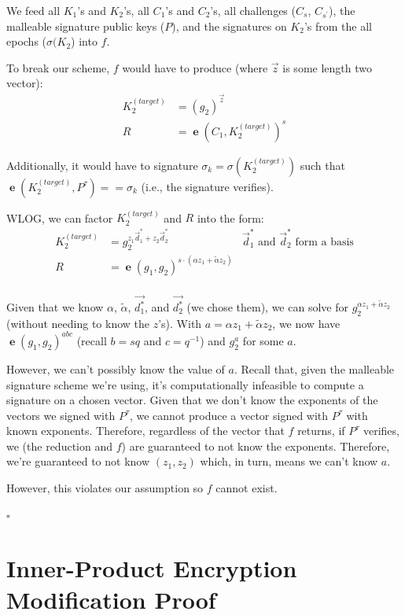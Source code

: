 \documentclass[pdftex,12pt,a4papaer,twoside,notitlepage]{report}
\DeclareMathOperator{\e}{\mathbf{e}}
\begin{document}
\begin{appendices}
We feed all $K_1$'s and $K_2$'s, all $C_1$'s and $C_2$'s, all challenges ($C_s$,
$C_{s^\prime}$), the malleable signature public keys ($P$), and the signatures on
$K_2$'s from the all epochs ($\sigma(K_2$) into $f$.

To break our scheme, $f$ would have to produce (where $\vec{z}$ is some length two vector):
\begin{align*}
  K^{(\mathit{target})}_{2} &= (g_2)^{\vec{z}} \\
  R &= \e(C_1, K^{(\mathit{target})}_{2})^s
\end{align*}

Additionally, it would have to signature $\sigma_k =
\sigma(K^{(\mathit{target})}_2)$ such that $\e(K^{(\mathit{target})}_2, P^\tau)
== \sigma_k$ (i.e., the signature verifies).

WLOG, we can factor $K_2^{\mathit{(target)}}$ and $R$ into the form:
\begin{align*}
  K_2^{\mathit{(target)}} &= g_2^{z_1 \vec{d}_1^* + z_2 \vec{d}_2^*} & \text{$\vec{d}_1^*$ and $\vec{d}_2^*$ form a basis} \\
  R &= \e(g_1, g_2)^{s \cdot (\alpha z_1 + \tilde{\alpha} z_2)} \\
\end{align*}

Given that we know $\alpha$, $\tilde{\alpha}$, $\vec{d_1^*}$, and $\vec{d_2^*}$
(we chose them), we can solve for $g_2^{\alpha z_1 + \tilde{\alpha} z_2}$
(without needing to know the $z$'s). With $a = \alpha z_1 + \tilde{\alpha} z_2$,
we now have $\e(g_1, g_2)^{abc}$ (recall $b = sq$ and $c=q^{-1}$) and $g_2^a$
for some $a$.

However, we can't possibly know the value of $a$. Recall that, given the
malleable signature scheme we're using, it's computationally infeasible to
compute a signature on a chosen vector. Given that we don't know the exponents
of the vectors we signed with $P^\tau$, we cannot produce a vector signed with
$P^\tau$ with known exponents. Therefore, regardless of the vector that $f$
returns, if $P^\tau$ verifies, we (the reduction and $f$) are guaranteed to not
know the exponents. Therefore, we're guaranteed to not know $(z_1, z_2)$ which,
in turn, means we can't know $a$.

However, this violates our assumption so $f$ cannot exist.

{\hfill $\square$}

\section{Inner-Product Encryption Modification Proof}
\label{proof:signature-modification}


\end{appendices}
\end{document}
